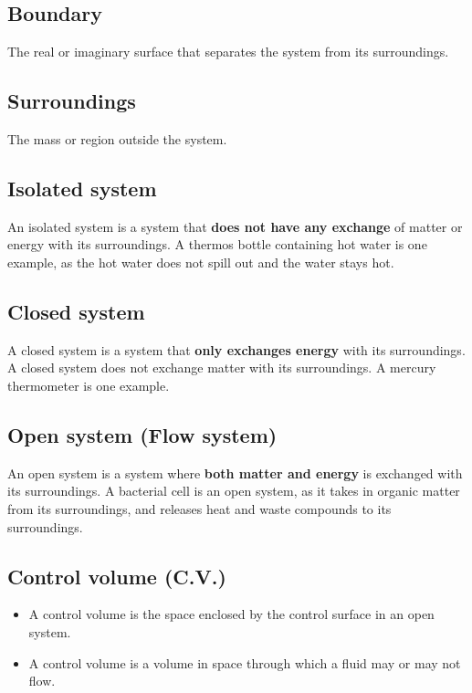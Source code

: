 \documentclass[11pt]{article}
\begin{document}
\subsection{Boundary}
\label{sec:org053b231}
The real or imaginary surface that separates the system from its surroundings.

\subsection{Surroundings}
\label{sec:org0ae87ff}
The mass or region outside the system.

\subsection{Isolated system}
\label{sec:org627c4d4}
An isolated system is a system that \textbf{does not have any exchange} of matter or energy with its surroundings. A thermos bottle containing hot water is one example, as the hot water does not spill out and the water stays hot.

\subsection{Closed system}
\label{sec:org73ec837}
A closed system is a system that \textbf{only exchanges energy} with its surroundings. A closed system does not exchange matter with its surroundings. A mercury thermometer is one example.

\subsection{Open system (Flow system)}
\label{sec:org8489e8c}
An open system is a system where \textbf{both matter and energy} is exchanged with its surroundings. A bacterial cell is an open system, as it takes in organic matter from its surroundings, and releases heat and waste compounds to its surroundings.

\subsection{Control volume (C.V.)}
\label{sec:orgca72da8}
\begin{itemize}
\item A control volume is the space enclosed by the control surface in an open system.
\item A control volume is a volume in space through which a fluid may or may not flow.
\end{itemize}
\end{document}
